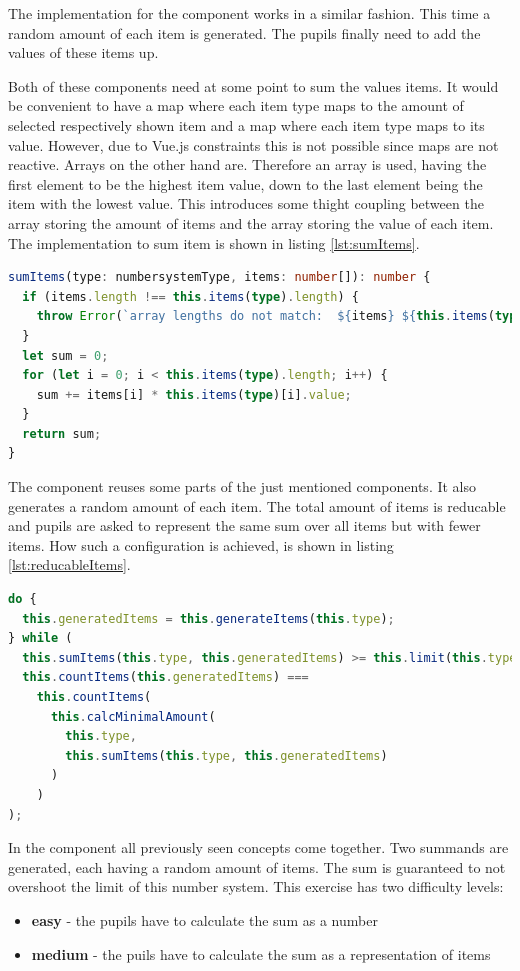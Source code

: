 The implementation for the  component works in a similar fashion. This time a random amount of each item is generated.  The pupils finally need to add the values of these items up.

Both of these components need at some point to sum the values items. It would be convenient to have a map where each item type maps to the amount of selected respectively shown item and a map where each item type maps to its value. However, due to Vue.js constraints this is not possible since maps are not reactive. 
Arrays on the other hand are. Therefore an array is used, having the first element to be the highest item value, down to the last element being the item with the lowest value. This introduces some thight coupling between the array storing the amount of items and the array storing the value of each item. The implementation to sum item is shown in listing \ref{lst:sumItems}.

\begin{lstlisting}[language=TypeScript,caption={Sum up items},label={lst:sumItems}]
sumItems(type: numbersystemType, items: number[]): number {
  if (items.length !== this.items(type).length) {
    throw Error(`array lengths do not match:  ${items} ${this.items(type)}`);
  }
  let sum = 0;
  for (let i = 0; i < this.items(type).length; i++) {
    sum += items[i] * this.items(type)[i].value;
  }
  return sum;
}
\end{lstlisting}

The  component reuses some parts of the just mentioned components. It also generates a random amount of each item. The total amount of items is reducable and pupils are asked to represent the same sum over all items but with fewer items. How such a configuration is achieved, is shown in listing \ref{lst:reducableItems}.

\begin{lstlisting}[language=TypeScript,caption={Generate a reducable item configuration},label={lst:reducableItems}]
do {
  this.generatedItems = this.generateItems(this.type);
} while (
  this.sumItems(this.type, this.generatedItems) >= this.limit(this.type) ||
  this.countItems(this.generatedItems) ===
    this.countItems(
      this.calcMinimalAmount(
        this.type,
        this.sumItems(this.type, this.generatedItems)
      )
    )
);
\end{lstlisting}

In the  component all previously seen concepts come together. Two summands are generated, each having a random amount of items. The sum is guaranteed to not overshoot the limit of this number system. This exercise has two difficulty levels:

\begin{itemize}
  \item \textbf{easy} - the pupils have to calculate the sum as a number 
  \item \textbf{medium} - the puils have to calculate the sum as a representation of items
\end{itemize}
